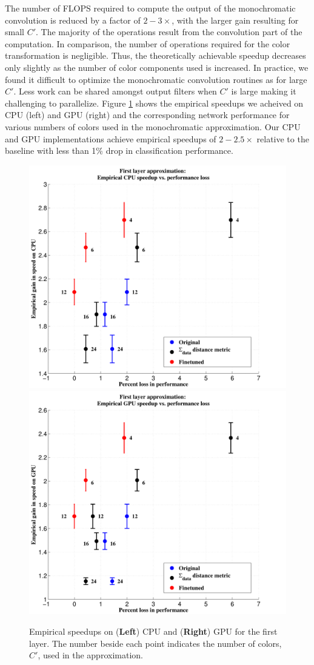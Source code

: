 The number of FLOPS required to compute the output of the monochromatic convolution is reduced by a factor of $2-3\times$, with the larger gain resulting for small $C'$. 
The majority of the operations result from the convolution part of the computation. In comparison, the number of operations required for the color transformation is negligible.
Thus, the theoretically achievable speedup decreases only slightly as the number of color components used is increased.
In practice, we found it difficult to optimize the monochromatic convolution routines as for large $C'$. Less work can be shared amongst output filters when $C'$ is large making it challenging to parallelize.
Figure \ref{fig:mono_speedups} shows the empirical speedups we acheived on CPU (left) and GPU (right) and the corresponding network performance for various numbers of colors used in the monochromatic approximation.   
Our CPU and GPU implementations achieve empirical speedups of $2-2.5\times$ relative to the baseline with less than 1\% drop in classification performance. 

\begin{figure}[t]
\centering
\begin{minipage}{0.75\textwidth}
      \includegraphics[width=0.5\linewidth]{img/layer1_CPUspeedup_vs_performance_loss_finetune_and_orig.pdf}
	\quad\quad
      \includegraphics[width=0.5\linewidth]{img/layer1_GPUspeedup_vs_performance_loss_finetune_and_orig.pdf}
\end{minipage}
\caption{Empirical speedups on ({\bf Left}) CPU and ({\bf Right}) GPU for the first layer. The number beside each point indicates the number of colors, $C'$, used in the approximation.}
\label{fig:mono_speedups}
\end{figure}

